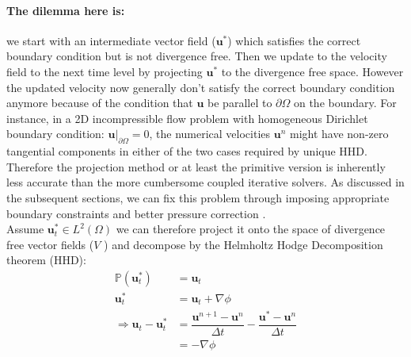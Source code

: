 \paragraph*{The dilemma here is:}
we start with an intermediate vector field ($\textbf{u}^*$) which satisfies the correct boundary condition but is not divergence free. Then we update to the velocity field to the next time level by projecting $\textbf{u}^*$ to the divergence free space. However the updated velocity now generally don't satisfy the correct boundary condition anymore because of the condition that $\textbf{u}$ be parallel to $\partial \Omega$ on the boundary. For instance, in a 2D incompressible flow problem with homogeneous Dirichlet boundary condition: $\textbf{u}|_{\partial \Omega} = 0$, the numerical velocities $\textbf{u}^n$ might have non-zero tangential components in either of the two cases required by unique HHD. Therefore the projection method or at least the primitive version is inherently less accurate than the more cumbersome coupled iterative solvers. As discussed in the subsequent sections, we can fix this problem through imposing appropriate boundary constraints and better pressure correction \cite{brown2001accurate}.\\
Assume $\textbf{u}^*_t \in \textit{L}^2 (\Omega)$ we can therefore project it onto the space of divergence free vector fields ($\textit{V}$ ) and decompose by the Helmholtz Hodge Decomposition theorem (HHD):
\begin{equation*}
\begin{aligned}
\mathbb{P} (\textbf{u}^*_t) &= \textbf{u}_t \\
\textbf{u}^*_t &= \textbf{u}_t + \nabla \textit{$\phi$}\\
\Rightarrow \textbf{u}_t - \textbf{u}^*_t &= \dfrac{\textbf{u}^{n+1} - \textbf{u}^n}{\Delta t} - \dfrac{\textbf{u}^* - \textbf{u}^n}{\Delta t} \\
&= -\nabla \textit{$\phi$} \\
\end{aligned}
\end{equation*}
